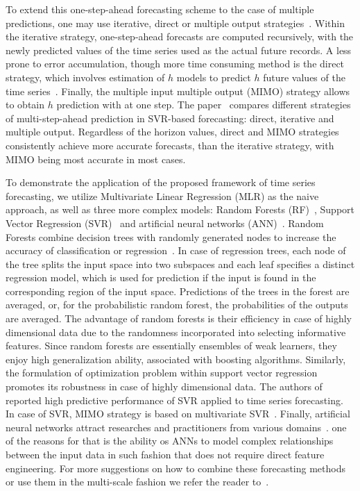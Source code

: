 \documentclass[conference]{IEEEtran}
\begin{document}
 To extend this one-step-ahead forecasting scheme to the case of multiple predictions, one may use iterative, direct or multiple output strategies~\cite{Bao2014}. Within the iterative strategy, one-step-ahead forecasts are computed recursively, with the newly predicted values of the time series used as the actual future records. A less prone to error accumulation, though more time consuming method is the direct strategy, which involves estimation of $h$ models to predict $h$ future values of the time series~\cite{Zhang2013}. Finally, the multiple input multiple output (MIMO) strategy allows to obtain $h$ prediction with at one step.  The paper~\cite{Bao2014} compares different strategies of multi-step-ahead prediction in SVR-based forecasting: direct, iterative and multiple output. Regardless of the horizon values, direct and MIMO strategies consistently achieve more accurate forecasts, than the iterative strategy, with MIMO being most accurate in most cases.


To demonstrate the application of the proposed framework of time series forecasting, we utilize Multivariate Linear Regression (MLR) as the naive approach, as well as three more complex models: Random Forests (RF)~\cite{Yu2016, Kane2014}, Support Vector Regression (SVR)~\cite{Trafalis2000, Navarrete2015, Hao2006} and artificial neural networks (ANN)~\cite{Busseti2012, Taylor2009}.  Random Forests combine decision trees with randomly generated nodes to increase the accuracy of classification or regression~\cite{Criminisi2011}. In case of regression trees, each node of the tree splits the input space into two subspaces and each leaf specifies a distinct regression model, which is used for prediction if the input is found in the corresponding region of the input space. Predictions of the trees in the forest are averaged, or, for the probabilistic random forest, the probabilities of the outputs are averaged. The advantage of random forests is their efficiency in case of highly dimensional data due to the randomness incorporated into selecting informative features. Since random forests are essentially ensembles of weak learners, they enjoy high generalization ability, associated with boosting algorithms.
 Similarly, the formulation of optimization problem within support vector regression promotes its robustness in case of highly dimensional data. The authors of~\cite{Trafalis2000, Hao2006} reported high predictive performance of SVR applied to time series forecasting. In case of SVR, MIMO strategy is based on multivariate SVR~\cite{PerezCruz2002}. Finally, artificial neural networks attract researches and practitioners from various domains~\cite{Taylor2009, Qiu2014}. one of the reasons for that is the ability os ANNs to model complex relationships between the input data in such fashion that does not require direct feature engineering. For more suggestions on how to combine these forecasting methods~\cite{Qiu2014, Grover2015} or use them in the multi-scale fashion we refer the reader to~\cite{Chen2004, Zhu2012, Cui2016, Bai2015, Ferrari2012}.
\end{document}
